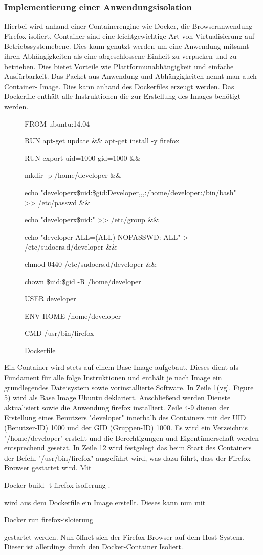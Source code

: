 \documentclass[journal=tosc,final]{iacrtrans}
\begin{document}
\subsubsection{Implementierung einer Anwendungsisolation}
Hierbei wird anhand einer Containerengine wie Docker, die Browseranwendung Firefox isoliert.
Container sind eine leichtgewichtige Art von Virtualisierung auf Betriebssystemebene. Dies kann genutzt werden um eine Anwendung mitsamt ihren Abhängigkeiten als eine abgeschlossene Einheit zu verpacken und zu betrieben.
Dies bietet Vorteile wie Plattformunabhängigkeit und einfache Ausfürbarkeit.
Das Packet aus Anwendung und Abhängigkeiten nennt man auch Container-
Image. Dies kann anhand des Dockerfiles erzeugt werden. Das Dockerfile
enthält alle Instruktionen die zur Erstellung des Images benötigt werden.
\begin{figure}[h]
\caption{Dockerfile }
\begin{shaded}
\begin{internallinenumbers}
FROM ubuntu:14.04

RUN apt-get update \&\& apt-get install -y firefox

RUN export uid=1000 gid=1000 \&\& \

mkdir -p /home/developer \&\& \

echo "developerx\${uid}:\${gid}:Developer,,,:/home/developer:/bin/bash" >> /etc/passwd \&\& \

echo "developerx\${uid}:" >> /etc/group \&\& \

echo "developer ALL=(ALL) NOPASSWD: ALL" > /etc/sudoers.d/developer \&\& \

chmod 0440 /etc/sudoers.d/developer \&\& \

chown \${uid}:\${gid} -R /home/developer

USER developer

ENV HOME /home/developer

CMD /usr/bin/firefox

 \end{internallinenumbers}
\end{shaded}
\end{figure}

Ein Container wird stets auf einem Base Image aufgebaut. Dieses dient als
Fundament für alle folge Instruktionen und enthält je nach Image ein grundlegendes Dateisystem sowie vorinstallierte Software.
In Zeile 1(vgl. Figure 5) wird als Base Image Ubuntu deklariert. Anschließend werden Dienste aktualisiert sowie die Anwendung firefox installiert. Zeile 4-9 dienen der Erstellung eines Benutzers "developer" innerhalb des Containers mit der UID (Benutzer-ID) 1000 und der GID (Gruppen-ID) 1000. Es wird ein Verzeichnis "/home/developer" erstellt und die Berechtigungen und Eigentümerschaft werden entsprechend gesetzt. In Zeile 12 wird festgelegt das beim Start des Containers der Befehl "/usr/bin/firefox" ausgeführt wird, was dazu führt, dass der Firefox-Browser gestartet wird. Mit \colorbox{mshadecolor}{\parbox{0.38\textwidth}{Docker build -t firefox-isolierung .}} wird aus dem Dockerfile ein Image erstellt. Dieses kann nun mit \colorbox{mshadecolor}{\parbox{0.31\textwidth}{Docker run firefox-isloierung}} gestartet werden. Nun öffnet sich der Firefox-Browser auf dem Host-System. Dieser ist allerdings durch den Docker-Container Isoliert.
\end{document}
